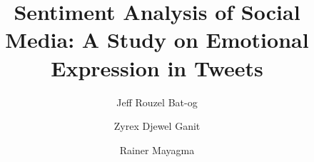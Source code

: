 
\title{Sentiment Analysis of Social Media: A Study on Emotional Expression in Tweets}
\author{Jeff Rouzel Bat-og \and Zyrex Djewel Ganit \and Rainer Mayagma}

\maketitle
